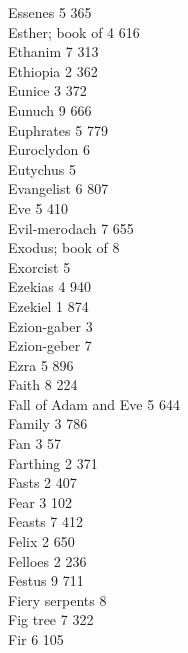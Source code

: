 Essenes \hfill 5 \quad \phantom{0}365\\
Esther; book of \hfill 4 \quad \phantom{0}616\\
Ethanim \hfill 7 \quad \phantom{0}313\\
Ethiopia \hfill 2 \quad \phantom{0}362\\
Eunice \hfill 3 \quad \phantom{0}372\\
Eunuch \hfill 9 \quad \phantom{0}666\\
Euphrates \hfill 5 \quad \phantom{0}779\\
Euroclydon \hfill 6 \\
Eutychus \hfill 5 \\
Evangelist \hfill 6 \quad \phantom{0}807\\
Eve \hfill 5 \quad \phantom{0}410\\
Evil-merodach \hfill 7 \quad \phantom{0}655\\
Exodus; book of \hfill 8 \\
Exorcist \hfill 5 \\
Ezekias \hfill 4 \quad \phantom{0}940\\
Ezekiel \hfill 1 \quad \phantom{0}874\\
Ezion-gaber \hfill 3 \\
Ezion-geber \hfill 7 \\
Ezra \hfill 5 \quad \phantom{0}896\\
Faith \hfill 8 \quad \phantom{0}224\\
Fall of Adam and Eve \hfill 5 \quad \phantom{0}644\\
Family \hfill 3 \quad \phantom{0}786\\
Fan \hfill 3 \quad \phantom{0}\phantom{0}57\\
Farthing \hfill 2 \quad \phantom{0}371\\
Fasts \hfill 2 \quad \phantom{0}407\\
Fear \hfill 3 \quad \phantom{0}102\\
Feasts \hfill 7 \quad \phantom{0}412\\
Felix \hfill 2 \quad \phantom{0}650\\
Felloes \hfill 2 \quad \phantom{0}236\\
Festus \hfill 9 \quad \phantom{0}711\\
Fiery serpents \hfill 8 \\
Fig tree \hfill 7 \quad \phantom{0}322\\
Fir \hfill 6 \quad \phantom{0}105\\
